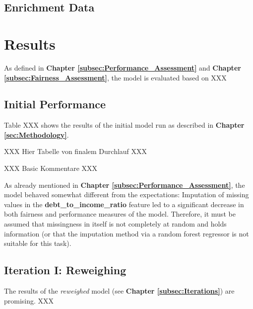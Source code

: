 \subsection{Enrichment Data}\label{subsec:Enrichment_Data}


\section{Results}\label{sec:Results}        

As defined in \textbf{Chapter \ref{subsec:Performance_Assessment}} and \textbf{Chapter \ref{subsec:Fairness_Assessment}}, the model is evaluated based on XXX



\subsection{Initial Performance}\label{subsec:Initial_Performance}

Table XXX shows the results of the initial model run as described in \textbf{Chapter \ref{sec:Methodology}}.

XXX Hier Tabelle von finalem Durchlauf XXX

XXX Basic Kommentare XXX

As already mentioned in \textbf{Chapter \ref{subsec:Performance_Assessment}}, the model behaved somewhat different from the expectations: Imputation of missing values in the \textbf{debt\_to\_income\_ratio} feature led to a significant decrease in both fairness and performance measures of the model.
Therefore, it must be assumed that missingness in itself is not completely at random and holds information (or that the imputation method via a random forest regressor is not suitable for this task).

\subsection{Iteration I: Reweighing}\label{subsec:Iteration_I}

The results of the \textit{reweighed} model (see \textbf{Chapter \ref{subsec:Iterations}}) are promising. XXX



